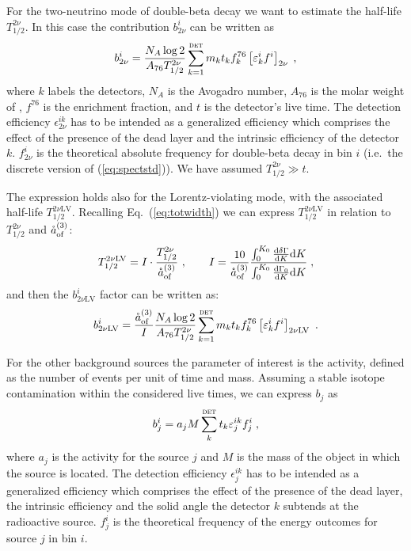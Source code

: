 \marginnote{$2\nbb$} For the two-neutrino mode of double-beta decay we want to estimate the half-life $T_{1/2}^{2\nu}$. In this case the contribution $b_{2\nu}^i$ can be written as
\begin{equation}b_{2\nu}^i=\frac{N_A\log2}{A_{76}T_{1/2}^{2\nu}}\sum_{k=1}^\textsc{det}m_kt_kf^{76}_k\left[\epsilon^i_kf^i\right]_{2\nu}\;,\end{equation}
	where $k$ labels the detectors, $N_A$ is the Avogadro number, $A_{76}$ is the molar weight of , $f^{76}$ is the enrichment fraction, and $t$ is the detector's live time. The detection efficiency $\epsilon_{2\nu}^{ik}$ has to be intended as a generalized efficiency which comprises the effect of the presence of the dead layer and the intrinsic efficiency of the detector $k$. $f_{2\nu}^i$ is the theoretical absolute frequency for double-beta decay in bin $i$ (i.e.~the discrete version of (\ref{eq:spectstd})). We have assumed $T_{1/2}^{2\nu}\gg t$.

	The expression holds also for the Lorentz-violating mode, with the associated half-life $T_{1/2}^{2\nu\text{LV}}$. Recalling Eq.~(\ref{eq:totwidth}) we can express $T_{1/2}^{2\nu\text{LV}}$ in relation to $T_{1/2}^{2\nu}$ and $\aof$:
\begin{equation}T_{1/2}^{2\nu\text{LV}}=I\cdot\frac{T_{1/2}^{2\nu}}{\aof}\ ,\qquad I=\frac{10}{\aof}\frac{\int_0^{K_0}\frac{\text{d}\delta\Gamma}{\text{d}K}\text{d}K}{\int_0^{K_0}\frac{\text{d}\Gamma_0}{\text{d}K}\text{d}K}\;,\end{equation}
and then the $b_{2\nu\text{LV}}^i$ factor can be written as:
\begin{equation}b_{2\nu\text{LV}}^i=\frac{\aof}{I}\frac{N_A\log2}{A_{76}T_{1/2}^{2\nu}}\sum_{k=1}^\textsc{det}m_kt_kf^{76}_k\left[\epsilon^i_kf^i\right]_{2\nu\text{LV}}\ .\end{equation}

 For the other background sources the parameter of interest is the activity, defined as the number of events per unit of time and mass. Assuming a stable isotope contamination within the considered live times, we can express $b_j$ as
\begin{equation}b_j^i=a_jM\sum_k^\textsc{det}t_k\epsilon_j^{ik}f_j^i\;,\label{eq:extsources}\end{equation}
where $a_j$ is the activity for the source $j$ and $M$ is the mass of the object in which the source is located. The detection efficiency $\epsilon_j^{ik}$ has to be intended as a generalized efficiency which comprises the effect of the presence of the dead layer, the intrinsic efficiency and the solid angle the detector $k$ subtends at the radioactive source. $f_j^i$ is the theoretical frequency of the energy outcomes for source $j$ in bin $i$.


